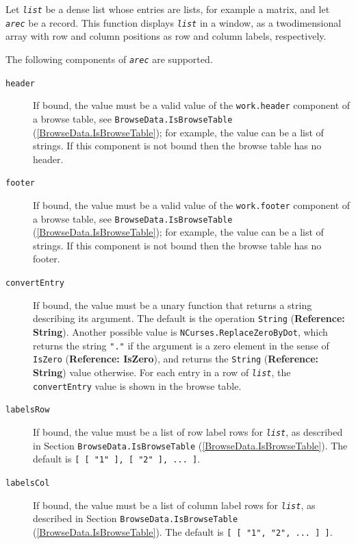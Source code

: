 \documentclass[a4paper,11pt]{report}
\begin{document}
{{{ Let \mbox{\texttt{\mdseries\slshape list}} be a dense list whose entries are lists, for example a matrix, and let \mbox{\texttt{\mdseries\slshape arec}} be a record. This function displays \mbox{\texttt{\mdseries\slshape list}} in a window, as a two\texttt{}dimensional array with row and column
positions as row and column labels, respectively. 

 The following components of \mbox{\texttt{\mdseries\slshape arec}} are supported. 
\begin{description}
\item[{\texttt{header}}]  If bound, the value must be a valid value of the \texttt{work.header} component of a browse table, see \texttt{BrowseData.IsBrowseTable} (\ref{BrowseData.IsBrowseTable}); for example, the value can be a list of strings. If this component is not
bound then the browse table has no header. 
\item[{\texttt{footer}}]  If bound, the value must be a valid value of the \texttt{work.footer} component of a browse table, see \texttt{BrowseData.IsBrowseTable} (\ref{BrowseData.IsBrowseTable}); for example, the value can be a list of strings. If this component is not
bound then the browse table has no footer. 
\item[{\texttt{convertEntry}}]  If bound, the value must be a unary function that returns a string describing
its argument. The default is the operation \texttt{String} (\textbf{Reference: String}). Another possible value is \texttt{NCurses.ReplaceZeroByDot}, which returns the string \texttt{"."} if the argument is a zero element in the sense of \texttt{IsZero} (\textbf{Reference: IsZero}), and returns the \texttt{String} (\textbf{Reference: String}) value otherwise. For each entry in a row of \mbox{\texttt{\mdseries\slshape list}}, the \texttt{convertEntry} value is shown in the browse table. 
\item[{\texttt{labelsRow}}]  If bound, the value must be a list of row label rows for \mbox{\texttt{\mdseries\slshape list}}, as described in Section \texttt{BrowseData.IsBrowseTable} (\ref{BrowseData.IsBrowseTable}). The default is \texttt{[ [ "1" ], [ "2" ], ... ]}. 
\item[{\texttt{labelsCol}}]  If bound, the value must be a list of column label rows for \mbox{\texttt{\mdseries\slshape list}}, as described in Section \texttt{BrowseData.IsBrowseTable} (\ref{BrowseData.IsBrowseTable}). The default is \texttt{[ [ "1", "2", ... ] ]}. 
\end{description}
 

}}}
\end{document}
